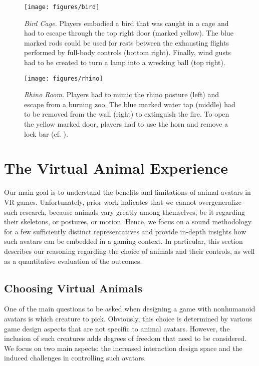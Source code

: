 \documentclass{sigchi}
\begin{document}
\begin{figure}[t!]
\centering
\texttt{[image: figures/bird]}
\caption{
\textit{Bird Cage.} Players embodied a bird that was caught in a cage and had to escape through the top right door (marked yellow). The blue marked rods could be used for rests between the exhausting flights performed by full-body controls (bottom right). Finally, wind gusts had to be created to turn a lamp into a wrecking ball (top right).}
\label{fig:bird}
\end{figure}

\begin{figure*}[t!]
\centering
\texttt{[image: figures/rhino]}
\caption{
\textit{Rhino Room.} Players had to mimic the rhino posture (left) and escape from a burning zoo. The blue marked water tap (middle) had to be removed from the wall (right) to extinguish the fire. To open the yellow marked door, players had to use the horn and remove a lock bar (cf. ).}
\label{fig:rhino}
\end{figure*}


\section{The Virtual Animal Experience}

Our main goal is to understand the benefits and limitations of animal avatars in VR games. Unfortunately, prior work indicates that we cannot overgeneralize such research, because animals vary greatly among themselves, be it regarding their skeletons, or postures, or motion. Hence, we focus on a sound methodology for a few sufficiently distinct representatives and provide in-depth insights how such avatars can be embedded in a gaming context. In particular, this section describes our reasoning regarding the choice of animals and their controls, as well as a quantitative evaluation of the outcomes.

\subsection{Choosing Virtual Animals}

One of the main questions to be asked when designing a game with nonhumanoid avatars is which creature to pick. Obviously, this choice is determined by various game design aspects that are not specific to animal avatars. However, the inclusion of such creatures adds degrees of freedom that need to be considered. We focus on two main aspects: the increased interaction design space and the induced challenges in controlling such avatars.
\end{document}
